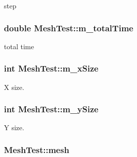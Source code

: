 step 

\subsubsection[{\texorpdfstring{m\+\_\+total\+Time}{m_totalTime}}]{\setlength{\rightskip}{0pt plus 5cm}double Mesh\+Test\+::m\+\_\+total\+Time\hspace{0.3cm}{\ttfamily [private]}}\hypertarget{classMeshTest_af34b52e88b6f15ad05dc07788e53e35b}{}\label{classMeshTest_af34b52e88b6f15ad05dc07788e53e35b}


total time 

\subsubsection[{\texorpdfstring{m\+\_\+x\+Size}{m_xSize}}]{\setlength{\rightskip}{0pt plus 5cm}int Mesh\+Test\+::m\+\_\+x\+Size\hspace{0.3cm}{\ttfamily [private]}}\hypertarget{classMeshTest_a46eca8d80e694b675c8a9b8dd737eb2f}{}\label{classMeshTest_a46eca8d80e694b675c8a9b8dd737eb2f}


X size. 

\subsubsection[{\texorpdfstring{m\+\_\+y\+Size}{m_ySize}}]{\setlength{\rightskip}{0pt plus 5cm}int Mesh\+Test\+::m\+\_\+y\+Size\hspace{0.3cm}{\ttfamily [private]}}\hypertarget{classMeshTest_a291ba9fda6f607983de4e69a65d6b3a5}{}\label{classMeshTest_a291ba9fda6f607983de4e69a65d6b3a5}


Y size. 

\subsubsection[{\texorpdfstring{mesh}{mesh}}]{ Mesh\+Test\+::mesh\hspace{0.3cm}{\ttfamily [private]}}\hypertarget{classMeshTest_aeca44e9e9db40bd844a65586028fd053}{}\label{classMeshTest_aeca44e9e9db40bd844a65586028fd053}



